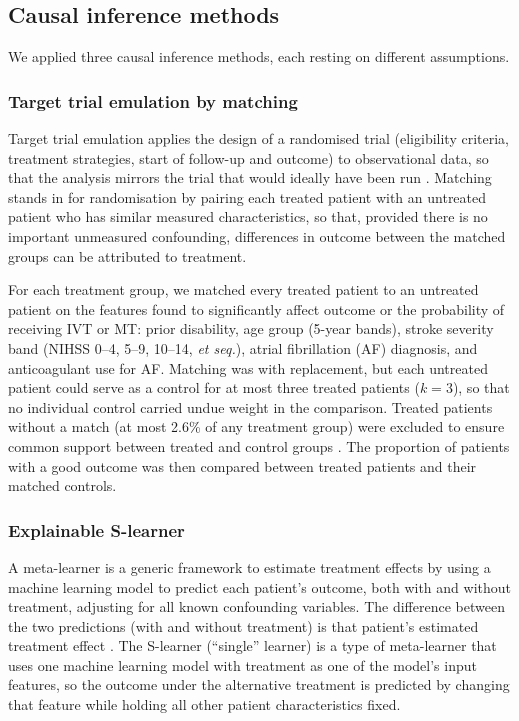 \subsection{Causal inference methods}

We applied three causal inference methods, each resting on different assumptions.

\subsubsection{Target trial emulation by matching}

Target trial emulation applies the design of a randomised trial (eligibility criteria, treatment strategies, start of follow-up and outcome) to observational data, so that the analysis mirrors the trial that would ideally have been run . Matching stands in for randomisation by pairing each treated patient with an untreated patient who has similar measured characteristics, so that, provided there is no important unmeasured confounding, differences in outcome between the matched groups can be attributed to treatment.

For each treatment group, we matched every treated patient to an untreated patient  on the features found to significantly affect outcome or the probability of receiving IVT or MT: prior disability, age group (5-year bands), stroke severity band (NIHSS 0--4, 5--9, 10--14, \textit{et seq.}), atrial fibrillation (AF) diagnosis, and anticoagulant use for AF. Matching was with replacement, but each untreated patient could serve as a control for at most three treated patients ($k=3$), so that no individual control carried undue weight in the comparison. Treated patients without a match (at most 2.6\% of any treatment group) were excluded to ensure common support between treated and control groups . The proportion of patients with a good outcome was then compared between treated patients and their matched controls.

\subsubsection{Explainable S-learner}\label{sec:supp_sl_methods}

A meta-learner is a generic framework to estimate treatment effects by using a machine learning model to predict each patient's outcome, both with and without treatment, adjusting for all known confounding variables. The difference between the two predictions (with and without treatment) is that patient's estimated treatment effect . The S-learner (``single'' learner) is a type of meta-learner that uses one machine learning model with treatment as one of the model's input features, so the outcome under the alternative treatment is predicted by changing that feature while holding all other patient characteristics fixed.

